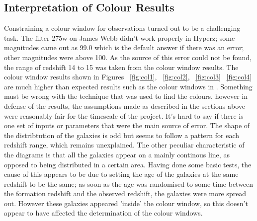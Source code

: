 	\subsection{Interpretation of Colour Results}
	\label{sub:Interp_Colour}
		Constraining a colour window for observations turned out to be a challenging task. The filter 275w on James Webb didn't work properly in Hyperz; some magnitudes came out as 99.0 which is the default answer if there was an error; other magnitudes were above 100. As the source of this error could not be found, the range of redshift 14 to 15 was taken from the colour window results. The colour window results  shown in Figures ~\ref{fig:col1}, ~\ref{fig:col2}, ~\ref{fig:col3}  ~\ref{fig:col4} are much higher than expected results such as the colour windows in \cite{lorenzoni2013constraining}. Something must be wrong with the technique that was used to find the colours, however in defense of the results, the assumptions made as described in the sections above were reasonably fair for the timescale of the project. It's hard to say if there is one set of inputs or parameters that were the main source of error.  The shape of the distribtution of the galaxies is odd but seems to follow a pattern for each redshift range, which remains unexplained. The other peculiar characteristic of the diagrams is that all the galaxies appear on a mainly continous line, as opposed to being distributed in a certain area. Having done some basic tests, the cause of this appears to be due to setting the age of the galaxies at the same redshift to be the same; as soon as the age was randomised to some time between the formation redshift and the observed redshift, the galaxies were more spread out. However these galaxies appeared 'inside' the colour window, so this doesn't appear to have affected the determination of the colour windows. 






